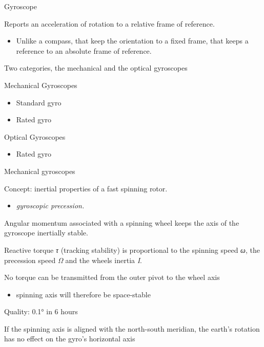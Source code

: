 \documentclass[compress]{beamer}
\providecommand{\tightlist}{%
  \setlength{\itemsep}{0pt}\setlength{\parskip}{0pt}}
\begin{document}
\begin{frame}{Gyroscope}

Reports an acceleration of rotation to a relative frame of reference.

\begin{itemize}
\tightlist
\item
  Unlike a compass, that keep the orientation to a fixed frame, that
  keeps a reference to an absolute frame of reference.
\end{itemize}

Two categories, the mechanical and the optical gyroscopes

Mechanical Gyroscopes

\begin{itemize}
\tightlist
\item
  Standard gyro
\item
  Rated gyro
\end{itemize}

Optical Gyroscopes

\begin{itemize}
\tightlist
\item
  Rated gyro
\end{itemize}

\end{frame}

\begin{frame}{Mechanical gyroscopes}

Concept: inertial properties of a fast spinning rotor.

\begin{itemize}
\tightlist
\item
  \emph{gyroscopic precession.}
\end{itemize}

Angular momentum associated with a spinning wheel keeps the axis of the
gyroscope inertially stable.

Reactive torque \emph{τ} (tracking stability) is proportional to the
spinning speed \emph{ω}, the precession speed \emph{Ω} and the wheels
inertia \emph{I}.

No torque can be transmitted from the outer pivot to the wheel axis

\begin{itemize}
\tightlist
\item
  spinning axis will therefore be space-stable
\end{itemize}

Quality: 0.1° in 6 hours

If the spinning axis is aligned with the north-south meridian, the
earth's rotation has no effect on the gyro's horizontal axis

\end{frame}
\end{document}
